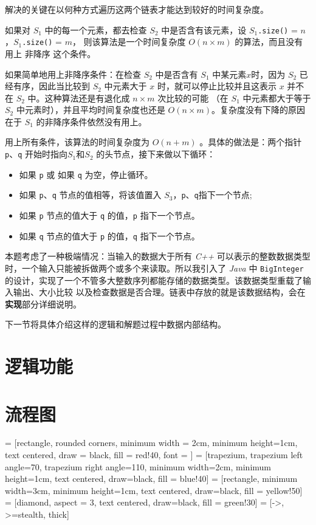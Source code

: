 解决的关键在以何种方式遍历这两个链表才能达到较好的时间复杂度。

如果对 $S_1$ 中的每一个元素，都去检查 $S_2$ 中是否含有该元素，设 $S_1$\lstinline{.size()} = $n$，$S_1$\lstinline{.size()} = $m$，%
则该算法是一个时间复杂度 $O(n \times m)$ 的算法，而且没有用上 {\kaishu 非降序} 这个条件。

如果简单地用上{\kaishu 非降序}条件：在检查 $S_2$ 中是否含有 $S_1$ 中某元素$x$时，因为 $S_2$ 已经有序，因此当比较到%
$S_2$ 中元素大于 $x$ 时，就可以停止比较并且这表示 $x$ 并不在 $S_2$ 中。这种算法还是有退化成 $n \times m$ 次比较的可能%
（在 $S_1$ 中元素都大于等于 $S_2$ 中元素时），并且平均时间复杂度也还是 $O(n \times m)$。复杂度没有下降的原因在于 $S_1$ %
的非降序条件依然没有用上。

用上所有条件，该算法的时间复杂度为 $O(n + m)$ 。具体的做法是：两个指针 \lstinline{p}、\lstinline{q} 开始时指向$S_1$和$S_2$%
的头节点，接下来做以下循环：\label{logic}
\begin{itemize}
    \item 如果 \lstinline{p} 或 如果 \lstinline{q} 为空，停止循环。
    \item 如果 \lstinline{p}、\lstinline{q} 节点的值相等，将该值置入 $S_3$，\lstinline{p}、\lstinline{q}指下一个节点;
    \item 如果 \lstinline{p} 节点的值大于 \lstinline{q} 的值，\lstinline{p} 指下一个节点。
    \item 如果 \lstinline{q} 节点的值大于 \lstinline{p} 的值，\lstinline{q} 指下一个节点。
\end{itemize}

本题考虑了一种极端情况：当输入的数据大于所有 \emph{C++} 可以表示的整数数据类型时，一个输入只能被拆做两个或多个来读取。所以我引入了%
\emph{Java} 中 \lstinline{BigInteger} 的设计，实现了一个不管多大整数序列都能存储的数据类型。该数据类型重载了输入输出、大小比较%
以及检查数据是否合理。链表中存放的就是该数据结构，会在\textbf{实现}部分详细说明。

下一节将具体介绍这样的逻辑和解题过程中数据内部结构。

\section{逻辑功能}

\section{流程图}

 = [rectangle, rounded corners, minimum width = 2cm, 
        minimum height=1cm, text centered, draw = black, fill = red!40,
        font = {\bfseries}]
     = [trapezium, trapezium left angle=70, trapezium right angle=110, 
    minimum width=2cm, minimum height=1cm, text centered, draw=black, fill = blue!40]
     = [rectangle, minimum width=3cm, minimum height=1cm, text centered, draw=black, fill = yellow!50]
     = [diamond, aspect = 3, text centered, draw=black, fill = green!30]
     = [->, >=stealth, thick]

